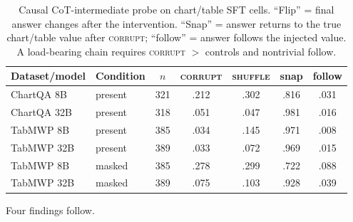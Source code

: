 \documentclass[11pt]{article}
\newcommand{\corrupt}{\textsc{corrupt}}
\newcommand{\shuffle}{\textsc{shuffle}}
\begin{document}
\begin{table}[t]
\centering
\footnotesize
\setlength{\tabcolsep}{5pt}
\caption{Causal CoT-intermediate probe on chart/table SFT cells. ``Flip'' = final answer changes after the intervention. ``Snap'' = answer returns to the true chart/table value after \corrupt{}; ``follow'' = answer follows the injected value. A load-bearing chain requires \corrupt{} $>$ controls and nontrivial follow.}
\label{tab:probe}
\begin{tabular}{@{}llccccc@{}}
\toprule
Dataset/model & Condition & $n$ & \corrupt & \shuffle & snap & follow \\
\midrule
ChartQA 8B  & present & 321 & .212 & .302 & .816 & .031 \\
ChartQA 32B & present & 318 & .051 & .047 & .981 & .016 \\
TabMWP 8B   & present & 385 & .034 & .145 & .971 & .008 \\
TabMWP 32B  & present & 389 & .033 & .072 & .969 & .015 \\
TabMWP 8B   & masked  & 385 & .278 & .299 & .722 & .088 \\
TabMWP 32B  & masked  & 389 & .075 & .103 & .928 & .039 \\
\bottomrule
\end{tabular}
\end{table}

Four findings follow.
\end{document}
